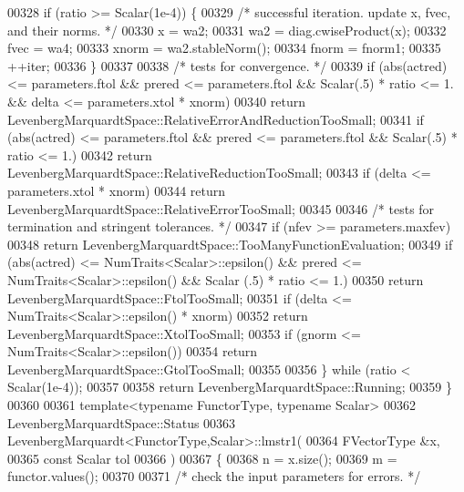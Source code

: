 \begin{DoxyCode}
00328         \textcolor{keywordflow}{if} (ratio >= Scalar(1e-4)) \{
00329             \textcolor{comment}{/* successful iteration. update x, fvec, and their norms. */}
00330             x = wa2;
00331             wa2 = diag.cwiseProduct(x);
00332             fvec = wa4;
00333             xnorm = wa2.stableNorm();
00334             fnorm = fnorm1;
00335             ++iter;
00336         \}
00337 
00338         \textcolor{comment}{/* tests for convergence. */}
00339         \textcolor{keywordflow}{if} (abs(actred) <= parameters.ftol && prered <= parameters.ftol && Scalar(.5) * ratio <= 1. && 
      delta <= parameters.xtol * xnorm)
00340             \textcolor{keywordflow}{return} LevenbergMarquardtSpace::RelativeErrorAndReductionTooSmall;
00341         \textcolor{keywordflow}{if} (abs(actred) <= parameters.ftol && prered <= parameters.ftol && Scalar(.5) * ratio <= 1.)
00342             \textcolor{keywordflow}{return} LevenbergMarquardtSpace::RelativeReductionTooSmall;
00343         \textcolor{keywordflow}{if} (delta <= parameters.xtol * xnorm)
00344             \textcolor{keywordflow}{return} LevenbergMarquardtSpace::RelativeErrorTooSmall;
00345 
00346         \textcolor{comment}{/* tests for termination and stringent tolerances. */}
00347         \textcolor{keywordflow}{if} (nfev >= parameters.maxfev)
00348             \textcolor{keywordflow}{return} LevenbergMarquardtSpace::TooManyFunctionEvaluation;
00349         \textcolor{keywordflow}{if} (abs(actred) <= NumTraits<Scalar>::epsilon() && prered <= NumTraits<Scalar>::epsilon() && Scalar
      (.5) * ratio <= 1.)
00350             \textcolor{keywordflow}{return} LevenbergMarquardtSpace::FtolTooSmall;
00351         \textcolor{keywordflow}{if} (delta <= NumTraits<Scalar>::epsilon() * xnorm)
00352             \textcolor{keywordflow}{return} LevenbergMarquardtSpace::XtolTooSmall;
00353         \textcolor{keywordflow}{if} (gnorm <= NumTraits<Scalar>::epsilon())
00354             \textcolor{keywordflow}{return} LevenbergMarquardtSpace::GtolTooSmall;
00355 
00356     \} \textcolor{keywordflow}{while} (ratio < Scalar(1e-4));
00357 
00358     \textcolor{keywordflow}{return} LevenbergMarquardtSpace::Running;
00359 \}
00360 
00361 \textcolor{keyword}{template}<\textcolor{keyword}{typename} FunctorType, \textcolor{keyword}{typename} Scalar>
00362 LevenbergMarquardtSpace::Status
00363 LevenbergMarquardt<FunctorType,Scalar>::lmstr1(
00364         FVectorType  &x,
00365         \textcolor{keyword}{const} Scalar tol
00366         )
00367 \{
00368     n = x.size();
00369     m = functor.values();
00370 
00371     \textcolor{comment}{/* check the input parameters for errors. */}

\end{DoxyCode}
